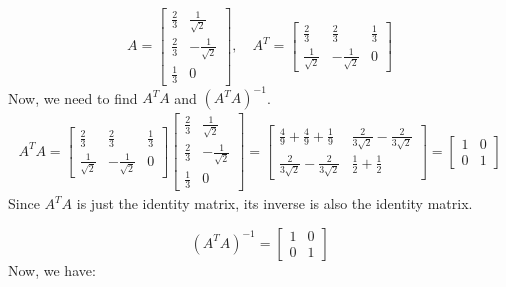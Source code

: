 \documentclass{article}
\begin{document}
$$
A = \begin{bmatrix} \frac{2}{3} & \frac{1}{\sqrt{2}} \\ \frac{2}{3} & -\frac{1}{\sqrt{2}} \\ \frac{1}{3} & 0 \end{bmatrix}
, \quad A^T = \begin{bmatrix} \frac{2}{3} & \frac{2}{3} & \frac{1}{3} \\ \frac{1}{\sqrt{2}} & -\frac{1}{\sqrt{2}} & 0 \end{bmatrix}
$$
Now, we need to find $A^T A$ and $(A^T A)^{-1}$.
\begin{align*}
    A^T A =
    \begin{bmatrix} \frac{2}{3} & \frac{2}{3} & \frac{1}{3} \\ \frac{1}{\sqrt{2}} & -\frac{1}{\sqrt{2}} & 0 \end{bmatrix}
    \begin{bmatrix} \frac{2}{3} & \frac{1}{\sqrt{2}} \\ \frac{2}{3} & -\frac{1}{\sqrt{2}} \\ \frac{1}{3} & 0 \end{bmatrix}
    = \begin{bmatrix} \frac{4}{9} + \frac{4}{9} + \frac{1}{9} & \frac{2}{3\sqrt{2}} - \frac{2}{3\sqrt{2}} \\ \frac{2}{3\sqrt{2}} - \frac{2}{3\sqrt{2}} & \frac{1}{2} + \frac{1}{2} \end{bmatrix}
    = \begin{bmatrix} 1 & 0 \\ 0 & 1 \end{bmatrix}
\end{align*}
Since $A^T A$ is just the identity matrix, its inverse is also the identity matrix.

$$ (A^T A)^{-1} = \begin{bmatrix} 1 & 0 \\ 0 & 1 \end{bmatrix} $$
Now, we have:
\end{document}
